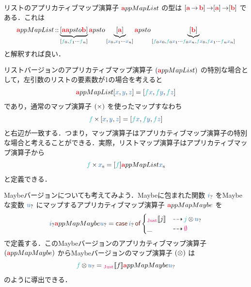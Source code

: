 \documentclass[a5paper,twoside,fleqn,draft]{jsbook}
\begin{document}
リストのアプリカティブマップ演算子 $\hTypeName{a}ppMapList$ の型は
$[\hTypeName{a}\hFunctionArrow\hTypeName{b}]\hFunctionArrow\hListConstruct{\hTypeName{a}}\hFunctionArrow[\hTypeName{b}]$ である．これは
\begin{equation}
  \hTypeName{a}ppMapList
  \hIsTypeOf\underbrace{[\hTypeName{a}\hTypeName{a}psto\hTypeName{b}]}_{[\hFunc{f}_0,\hFunc{f}_1\dotsb \hFunc{f}_n]}
  \hTypeName{a}psto\underbrace{\hListConstruct{\hTypeName{a}}}_{[\hVar{x}_0,\hVar{x}_1\dotsb \hVar{x}_n]}
  \hTypeName{a}psto\underbrace{[\hTypeName{b}]}_{[\hFunc{f}_0\hVar{x}_0,\hFunc{f}_0\hVar{x}_1\dotsb \hFunc{f}_0\hVar{x}_n,\hFunc{f} \hVar{x}_0,\hFunc{f} \hVar{x}_1\dotsb \hFunc{f}_n\hVar{x}_n]}
\end{equation}
と解釈すれば良い．

リストバージョンのアプリカティブマップ演算子 $(\hTypeName{a}ppMapList)$ の特別な場合として，左引数のリストの要素数が1の場合を考えると
\begin{equation}
  [\hFunc{f}]\hTypeName{a}ppMapList{}[\hVar{x},\hVar{y},\hVar{z}]
  =[\hFunc{f}\hVar{x},\hFunc{f}\hVar{y},\hFunc{f}\hVar{z}]
\end{equation}
であり，通常のマップ演算子 $(\operatorname{\times})$ を使ったマップすなわち
\begin{equation}
  \hFunc{f}\hMap{}[\hVar{x},\hVar{y},\hVar{z}]
  =[\hFunc{f}\hVar{x},\hFunc{f}\hVar{y},\hFunc{f}\hVar{z}]
\end{equation}
と右辺が一致する．つまり，マップ演算子はアプリカティブマップ演算子の特別な場合と考えることができる．実際，リストマップ演算子はアプリカティブマップ演算子から
\begin{equation}
  \hFunc{f}\hMap\hListVar{x}
  =[\hFunc{f}]\hTypeName{a}ppMapList\hListVar{x}
\end{equation}
と定義できる．

Maybeバージョンについても考えてみよう．Maybeに包まれた関数 $\hMaybeVar{i}$ をMaybeな変数 $\hMaybeVar{u}$ にマップするアプリカティブマップ演算子
$\hTypeName{a}ppMapMaybe$ を
\begin{equation}
  \hMaybeVar{i}\hTypeName{a}ppMapMaybe\hMaybeVar{u}
  =\hCaseSyntax{\hMaybeVar{i}}
  \begin{cases}
    \hJustWith{j}
    &\hIfSo\mJFunc\hMaybeMap\hMaybeVar{u}\\
    \_
    &\hIfSo\hNothing
  \end{cases}
\end{equation}
で定義する．このMaybeバージョンのアプリカティブマップ演算子 $(\hTypeName{a}ppMapMaybe)$ からMaybeバージョンのマップ演算子 $(\operatorname{\otimes})$ は
\begin{equation}
  \hFunc{f}\hMaybeMap\hMaybeVar{u}
  =\hJustWith{f}\hTypeName{a}ppMapMaybe\hMaybeVar{u}
\end{equation}
のように導出できる．
\end{document}
